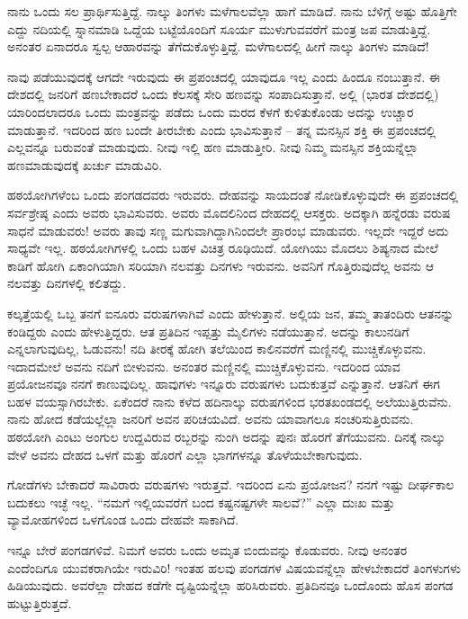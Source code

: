 ನಾನು ಒಂದು ಸಲ ಪ್ರಾರ್ಥಿಸುತ್ತಿದ್ದೆ. ನಾಲ್ಕು ತಿಂಗಳು ಮಳೆಗಾಲವೆಲ್ಲಾ ಹಾಗೆ ಮಾಡಿದೆ. ನಾನು ಬೆಳಿಗ್ಗೆ ಅಷ್ಟು ಹೊತ್ತಿಗೇ ಎದ್ದು ನದಿಯಲ್ಲಿ ಸ್ನಾನಮಾಡಿ ಒದ್ದೆಯ ಬಟ್ಟೆಯೊಂದಿಗೆ ಸೂರ್ಯ ಮುಳುಗುವವರೆಗೆ ಮಂತ್ರ ಜಪ ಮಾಡುತ್ತಿದ್ದೆ. ಅನಂತರ ಏನಾದರೂ ಸ್ವಲ್ಪ ಆಹಾರವನ್ನು ತೆಗೆದುಕೊಳ್ಳುತ್ತಿದ್ದೆ. ಮಳೆಗಾಲದಲ್ಲಿ ಹೀಗೆ ನಾಲ್ಕು ತಿಂಗಳು ಮಾಡಿದೆ!

ನಾವು ಪಡೆಯುವುದಕ್ಕೆ ಆಗದೇ ಇರುವುದು ಈ ಪ್ರಪಂಚದಲ್ಲಿ ಯಾವುದೂ ಇಲ್ಲ ಎಂದು ಹಿಂದೂ ನಂಬುತ್ತಾನೆ. ಈ ದೇಶದಲ್ಲಿ ಜನರಿಗೆ ಹಣಬೇಕಾದರೆ ಒಂದು ಕೆಲಸಕ್ಕೆ ಸೇರಿ ಹಣವನ್ನು ಸಂಪಾದಿಸುತ್ತಾನೆ. ಅಲ್ಲಿ (ಭಾರತ ದೇಶದಲ್ಲಿ) ಯಾರಿಂದಲಾದರೂ ಒಂದು ಮಂತ್ರವನ್ನು ಪಡೆದು ಒಂದು ಮರದ ಕೆಳಗೆ ಕುಳಿತುಕೊಂಡು ಅದನ್ನು ಉಚ್ಚಾರ ಮಾಡುತ್ತಾನೆ. ಇದರಿಂದ ಹಣ ಬಂದೇ ತೀರಬೇಕು ಎಂದು ಭಾವಿಸುತ್ತಾನೆ – ತನ್ನ ಮನಸ್ಸಿನ ಶಕ್ತಿ ಈ ಪ್ರಪಂಚದಲ್ಲಿ ಎಲ್ಲವನ್ನೂ ಬರುವಂತೆ ಮಾಡುವುದು. ನೀವು ಇಲ್ಲಿ ಹಣ ಮಾಡುತ್ತೀರಿ. ನೀವು ನಿಮ್ಮ ಮನಸ್ಸಿನ ಶಕ್ತಿಯನ್ನೆಲ್ಲಾ ಹಣಮಾಡುವುದಕ್ಕೆ ಖರ್ಚು ಮಾಡುವಿರಿ.

ಹಠಯೋಗಿಗಳೆಂಬ ಒಂದು ಪಂಗಡದವರು ಇರುವರು. ದೇಹವನ್ನು ಸಾಯದಂತೆ ನೋಡಿಕೊಳ್ಳುವುದೇ ಈ ಪ್ರಪಂಚದಲ್ಲಿ ಸರ್ವಶ್ರೇಷ್ಠ ಎಂದು ಅವರು ಭಾವಿಸುವರು. ಅವರು ಮೊದಲಿನಿಂದ ದೇಹದಲ್ಲಿ ಆಸಕ್ತರು. ಅದಕ್ಕಾಗಿ ಹನ್ನೆರಡು ವರುಷ ಸಾಧನೆ ಮಾಡುವರು! ಅವರು ತಾವು ಸಣ್ಣ ಮಗುವಾಗಿದ್ದಾಗಿನಿಂದಲೇ ಪ್ರಾರಂಭ ಮಾಡುವರು. ಇಲ್ಲದೇ ಇದ್ದರೆ ಅದು ಸಾಧ್ಯವೇ ಇಲ್ಲ. ಹಠಯೋಗಿಗಳಲ್ಲಿ ಒಂದು ಬಹಳ ವಿಚಿತ್ರ ರೂಢಿಯಿದೆ. ಯೋಗಿಯು ಮೊದಲು ಶಿಷ್ಯನಾದ ಮೇಲೆ ಕಾಡಿಗೆ ಹೋಗಿ ಏಕಾಂಗಿಯಾಗಿ ಸರಿಯಾಗಿ ನಲವತ್ತು ದಿನಗಳು ಇರುವನು. ಅವನಿಗೆ ಗೊತ್ತಿರುವುದೆಲ್ಲ ಅವನು ಆ ನಲವತ್ತು ದಿನಗಳಲ್ಲಿ ಕಲಿತದ್ದು.

ಕಲ್ಕತ್ತೆಯಲ್ಲಿ ಒಬ್ಬ ತನಗೆ ಐನೂರು ವರುಷಗಳಾಗಿವೆ ಎಂದು ಹೇಳುತ್ತಾನೆ. ಅಲ್ಲಿಯ ಜನ, ತಮ್ಮ ತಾತಂದಿರು ಆತನನ್ನು ಕಂಡಿದ್ದರು ಎಂದು ಹೇಳುತ್ತಿದ್ದರು. ಆತ ಪ್ರತಿದಿನ ಇಪ್ಪತ್ತು ಮೈಲಿಗಳು ನಡೆಯುತ್ತಾನೆ. ಅದನ್ನು ಕಾಲುನಡಿಗೆ ಎನ್ನಲಾಗುವುದಿಲ್ಲ, ಓಡುವನು! ನದಿ ತೀರಕ್ಕೆ ಹೋಗಿ ತಲೆಯಿಂದ ಕಾಲಿನವರೆಗೆ ಮಣ್ಣಿನಲ್ಲಿ ಮುಚ್ಚಿಕೊಳ್ಳುವನು. ಇದಾದಮೇಲೆ ಅವನು ನದಿಗೆ ಬೀಳುವನು. ಅನಂತರ ಮಣ್ಣಿನಲ್ಲಿ ಮುಚ್ಚಿಕೊಳ್ಳುವನು. ಇದರಿಂದ ಯಾವ ಪ್ರಯೋಜನವೂ ನನಗೆ ಕಾಣುವುದಿಲ್ಲ. ಹಾವುಗಳು ಇನ್ನೂರು ವರುಷಗಳು ಬದುಕುತ್ತವೆ ಎನ್ನುತ್ತಾನೆ. ಆತನಿಗೆ ಈಗ ಬಹಳ ವಯಸ್ಸಾಗಿರಬೇಕು. ಏಕೆಂದರೆ ನಾನು ಕಳೆದ ಹದಿನಾಲ್ಕು ವರುಷಗಳಿಂದ ಭರತಖಂಡದಲ್ಲಿ ಅಲೆಯುತ್ತಿರುವೆನು. ನಾನು ಹೋದ ಕಡೆಯಲ್ಲೆಲ್ಲಾ ಜನರಿಗೆ ಅವನ ಪರಿಚಯವಿದೆ. ಅವನು ಯಾವಾಗಲೂ ಸಂಚರಿಸುತ್ತಿರುವನು. ಹಠಯೋಗಿ ಎಂಟು ಅಂಗುಲ ಉದ್ದವಿರುವ ರಬ್ಬರನ್ನು ನುಂಗಿ ಅದನ್ನು ಪುನಃ ಹೊರಗೆ ತೆಗೆಯುವನು. ದಿನಕ್ಕೆ ನಾಲ್ಕು ವೇಳೆ ಅವನು ದೇಹದ ಒಳಗೆ ಮತ್ತು ಹೊರಗೆ ಎಲ್ಲಾ ಭಾಗಗಳನ್ನೂ ತೊಳೆಯಬೇಕಾಗುವುದು.

ಗೋಡೆಗಳು ಬೇಕಾದರೆ ಸಾವಿರಾರು ವರುಷಗಳು ಇರುತ್ತವೆ. ಇದರಿಂದ ಏನು ಪ್ರಯೋಜನ? ನನಗೆ ಇಷ್ಟು ದೀರ್ಘಕಾಲ ಬದುಕಲು ಇಚ್ಛೆ ಇಲ್ಲ. “ನಮಗೆ ಇಲ್ಲಿಯವರೆಗೆ ಬಂದ ಕಷ್ಟನಷ್ಟಗಳೇ ಸಾಲವೆ?” ಎಲ್ಲಾ ದುಃಖ ಮತ್ತು ವ್ಯಾಮೋಹಗಳಿಂದ ಒಳಗೊಂಡ ಒಂದು ದೇಹವೇ ಸಾಕಾಗಿದೆ.

ಇನ್ನೂ ಬೇರೆ ಪಂಗಡಗಳಿವೆ. ನಿಮಗೆ ಅವರು ಒಂದು ಅಮೃತ ಬಿಂದುವನ್ನು ಕೊಡುವರು. ನೀವು ಅನಂತರ ಎಂದೆಂದಿಗೂ ಯುವಕರಾಗಿಯೇ ಇರುವಿರಿ! ಇಂತಹ ಹಲವು ಪಂಗಡಗಳ ವಿಷಯವನ್ನೆಲ್ಲಾ ಹೇಳಬೇಕಾದರೆ ತಿಂಗಳುಗಳು ಹಿಡಿಯುವುದು. ಅವರೆಲ್ಲಾ ದೇಹದ ಕಡೆಗೇ ದೃಷ್ಟಿಯನ್ನೆಲ್ಲಾ ಹರಿಸಿರುವರು. ಪ್ರತಿದಿನವೂ ಒಂದೊಂದು ಹೊಸ ಪಂಗಡ ಹುಟ್ಟುತ್ತಿರುತ್ತದೆ.


